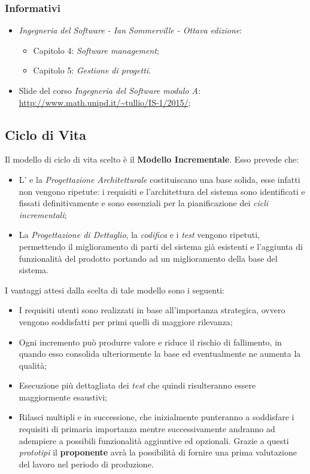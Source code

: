 \subsubsection{Informativi}
	\begin{itemize}
		\item \textit{Ingegneria del Software - Ian Sommerville - Ottava edizione}:
		\begin{itemize}
			\item Capitolo 4: \textit{Software management};
			\item Capitolo 5: \textit{Gestione di progetti}.
		\end{itemize}
		\item Slide del corso \textit{Ingegneria del Software modulo A}:
		\url{http://www.math.unipd.it/~tullio/IS-1/2015/};
	\end{itemize}
\subsection{Ciclo di Vita}
Il modello di ciclo di vita scelto è il \textbf{Modello Incrementale}. Esso prevede che:
\begin{itemize}
	\item L'\textit{\AdR} e la \textit{Progettazione Architetturale} costituiscano una base solida, esse infatti non vengono ripetute: i requisiti e l'architettura del sistema sono identificati e fissati definitivamente e sono essenziali per la pianificazione dei \textit{cicli incrementali};
	\item La \textit{Progettazione di Dettaglio}, la \textit{codifica} e i \textit{test} vengono ripetuti, permettendo il miglioramento di parti del sistema già esistenti e l'aggiunta di funzionalità del prodotto portando ad un miglioramento della base del sistema.
\end{itemize}
I vantaggi attesi dalla scelta di tale modello sono i seguenti:
\begin{itemize}
	\item I requisiti utenti sono realizzati in base all'importanza strategica, ovvero vengono soddisfatti per primi quelli di maggiore rilevanza;
	\item Ogni incremento può produrre valore e riduce il rischio di fallimento, in quando esso consolida ulteriormente la base ed eventualmente ne aumenta la qualità;
	\item Esecuzione più dettagliata dei \textit{test} che quindi risulteranno essere maggiormente esaustivi;
	\item Rilasci multipli e in successione, che inizialmente punteranno a soddisfare i requisiti di primaria importanza mentre successivamente andranno ad adempiere a possibili funzionalità aggiuntive ed opzionali. Grazie a questi \textit{prototipi} il \textbf{proponente} avrà la possibilità di fornire una prima valutazione del lavoro nel periodo di produzione.
\end{itemize}
